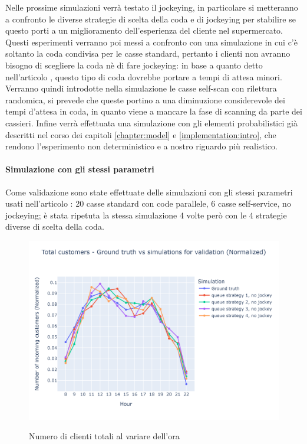 Nelle prossime simulazioni verrà testato il jockeying, in particolare
si metteranno a confronto le diverse strategie di scelta della coda e
di jockeying per stabilire se questo porti a un miglioramento
dell'esperienza del cliente nel supermercato. Questi esperimenti
verranno poi messi a confronto con una simulazione in cui c'è soltanto
la coda condivisa per le casse standard, pertanto i clienti non
avranno bisogno di scegliere la coda nè di fare jockeying: in base a
quanto detto nell'articolo \cite{yanagisawa2011methods}, questo tipo
di coda dovrebbe portare a tempi di attesa minori.  Verranno quindi
introdotte nella simulazione le casse self-scan con rilettura
randomica, si prevede che queste portino a una diminuzione
considerevole dei tempi d'attesa in coda, in quanto viene a mancare la
fase di scanning da parte dei cassieri. Infine verrà effettuata una
simulazione con gli elementi probabilistici già descritti nel corso
dei capitoli \ref{chapter:model} e \ref{implementation:intro}, che
rendono l'esperimento non deterministico e a nostro riguardo più
realistico.

\paragraph{Simulazione con gli stessi parametri}

Come validazione sono state effettuate delle simulazioni con gli stessi parametri usati nell'articolo \cite{article1}: 20 casse standard con code parallele, 6 casse self-service, no jockeying; è stata ripetuta la stessa simulazione 4 volte però con le 4 strategie diverse di scelta della coda.

\begin{figure}[H]
	\centering
	\includegraphics[width=12cm]{"images/results/total_customers_validation.png"}
	\label{fig:total_customers_validation}
	\caption{Numero di clienti totali al variare dell'ora}
\end{figure}


